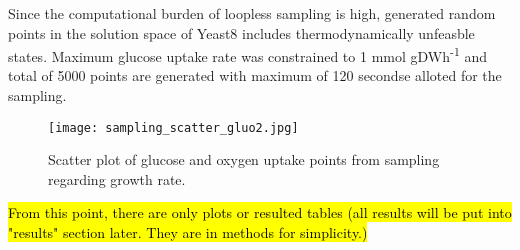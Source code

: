 Since the computational burden of loopless sampling is high, generated random points in the solution space of Yeast8 includes thermodynamically unfeasble states. Maximum glucose uptake rate was constrained to 1 mmol gDWh\textsuperscript{-1} and total of 5000 points are generated with maximum of 120 secondse alloted for the sampling.

\begin{figure}[H]
\begin{center}
\texttt{[image: sampling\_scatter\_gluo2.jpg]}
\end{center}
\caption[Scatter plot of glucose and oxygen uptake points from sampling]{Scatter plot of glucose and oxygen uptake points from sampling regarding growth rate.}
\label{fig:sampling_scatter_gluo2}
\end{figure}

\hl{From this point, there are only plots or resulted tables (all results will be put into "results" section later. They are in methods for simplicity.)}


